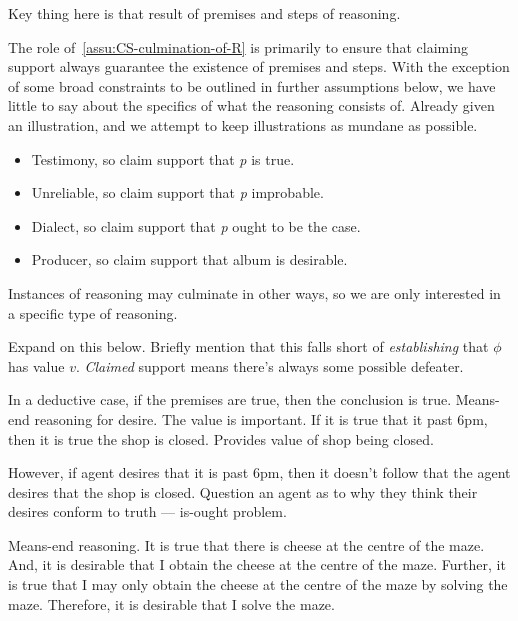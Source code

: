 \begin{note}
  Key thing here is that result of premises and steps of reasoning.

  The role of~\autoref{assu:CS-culmination-of-R} is primarily to ensure that claiming support always guarantee the existence of premises and steps.
  With the exception of some broad constraints to be outlined in further assumptions below,  we have little to say about the specifics of what the reasoning consists of.
  Already given an illustration, and we attempt to keep illustrations as mundane as possible.
\end{note}

\begin{note}
  \begin{itemize}
  \item Testimony, so claim support that \emph{p} is true.
  \item Unreliable, so claim support that \emph{p} improbable.
  \item Dialect, so claim support that \emph{p} ought to be the case.
  \item Producer, so claim support that album is desirable.
  \end{itemize}
\end{note}

\begin{note}
  Instances of reasoning may culminate in other ways, so we are only interested in a specific type of reasoning.
\end{note}

\begin{note}
  Expand on this below.
  Briefly mention that this falls short of \emph{establishing} that \(\phi\) has value \(v\).
  \emph{Claimed} support means there's always some possible defeater.
\end{note}

\begin{note}
  In a deductive case, if the premises are true, then the conclusion is true.
  Means-end reasoning for desire.
  The value is important.
  If it is true that it past 6pm, then it is true the shop is closed.
  Provides value of shop being closed.

  However, if agent desires that it is past 6pm, then it doesn't follow that the agent desires that the shop is closed.
  Question an agent as to why they think their desires conform to truth --- is-ought problem.

  Means-end reasoning.
  It is true that there is cheese at the centre of the maze.
  And, it is desirable that I obtain the cheese at the centre of the maze.
  Further, it is true that I may only obtain the cheese at the centre of the maze by solving the maze.
  Therefore, it is desirable that I solve the maze.
\end{note}

